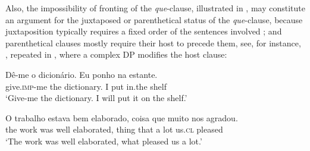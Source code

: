 \documentclass[output=paper,colorlinks,citecolor=brown,
]{langscibook}
\begin{document}
Also, the impossibility of fronting of the \textit{que}-clause, illustrated in , may constitute an argument for the juxtaposed or parenthetical status of the \textit{que}-clause, because juxtaposition typically requires a fixed order of the sentences involved ; and parenthetical clauses mostly require their host to precede them, see, for instance, , repeated in , where a complex DP modifies the host clause:

\ea \label{ex:matos:estante}
  \label{ex:matos:estante-a}
  \label{ex:matos:advogado-papeis}
  \label{ex:matos:chorar-aconteceu}
  \label{ex:matos:revista-jornal}
 \z
\z 

\ea \label{ex:matos:dicionario}
 \ea \label{ex:matos:dicionario-a}
 \gll Dê-me o dicionário. Eu ponho na estante.\\
	  give.\textsc{imp}-me the dictionary. I put in.the shelf\\	
 \glt ‘Give-me the dictionary. I will put it on the shelf.’
  \label{ex:matos:dicionario-b}
 \z
\z 

\ea \label{ex:matos:trabalho}
 \ea \label{ex:matos:trabalho-a}
 \gll O trabalho estava bem elaborado, coisa que muito nos agradou.\\
      the work was well elaborated, thing that {a lot} us.\textsc{cl} pleased\\
 \glt ‘The work was well elaborated, what pleased us a lot.’
  \label{ex:matos:trabalho-b}
 \z
\z 
\end{document}
